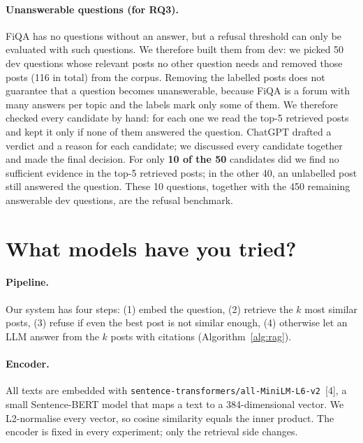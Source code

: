 \documentclass[11pt]{article}
\begin{document}
\paragraph{Unanswerable questions (for RQ3).} FiQA has no questions without an answer, but a refusal threshold can
only be evaluated with such questions. We therefore built them from dev: we picked 50 dev questions whose relevant
posts no other question needs and removed those posts (116 in total) from the corpus. Removing the labelled posts
does not guarantee that a question becomes unanswerable, because FiQA is a forum with many answers per topic and
the labels mark only some of them. We therefore checked every candidate by hand: for each one we read the top-5
retrieved posts and kept it only if none of them answered the question. ChatGPT drafted a verdict and a reason for
each candidate; we discussed every candidate together and made the final decision. For only \textbf{10 of the 50}
candidates did we find no sufficient evidence in the top-5 retrieved posts; in the other 40, an unlabelled post
still answered the question. These 10
questions, together with the 450 remaining answerable dev questions, are the refusal benchmark.

\section{What models have you tried?}

\paragraph{Pipeline.} Our system has four steps: (1) embed the question, (2) retrieve the $k$ most similar posts,
(3) refuse if even the best post is not similar enough, (4) otherwise let an LLM answer from the $k$ posts with
citations (Algorithm~\ref{alg:rag}).

\paragraph{Encoder.} All texts are embedded with \texttt{sentence-transformers/all-MiniLM-L6-v2}~[4], a small
Sentence-BERT model that maps a text to a 384-dimensional vector. We L2-normalise every vector, so cosine
similarity equals the inner product. The encoder is fixed in every experiment; only the retrieval side changes.
\end{document}
